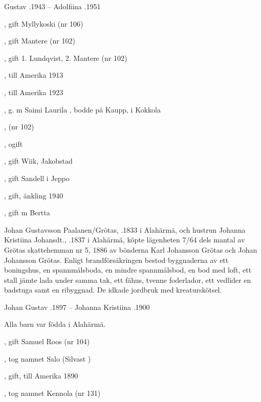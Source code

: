 Gustav .1943  --  Adolfiina .1951
\begin{jhchildren}
  \item {}, gift Myllykoski (nr 106)
  \item {}, gift Mantere (nr 102)
  \item {}, gift 1. Lundqvist, 2. Mantere (nr 102)
  \item {}, till Amerika 1913
  \item {}, till Amerika 1923
  \item {}, g. m Saimi Laurila , bodde på Kaupp,  i Kokkola
  \item {}
  \item {}, (nr 102)
  \item {}, ogift
  \item {}, gift Wiik, Jakobstad
  \item {}
  \item {}, gift Sandell i Jeppo
  \item {}, gift, änkling 1940
  \item {}, gift m Bertta
\end{jhchildren}


Johan Gustavsson Paalanen/Grötas, .1833 i Alahärmä, och hustrun Johanna Kristiina Johansdt., .1837 i Alahärmä, köpte lägenheten 7/64 dels mantal av Grötas skattehemman  nr 5, 1886 av bönderna Karl Johansson Grötas och Johan Johansson Grötas. Enligt brandförsäkringen bestod byggnaderna av ett boningshus, en spannmålsboda, en mindre spannmålsbod, en bod med loft, ett stall jämte lada under samma tak, ett fähus, tvenne foderlador, ett vedlider en badstuga samt en ribyggnad. De idkade jordbruk med kreaturskötsel.

Johan Gustav .1897  --  Johanna Kristiina .1900

Alla barn var födda i Alahärmä.
\begin{jhchildren}
  \item {}
  \item {}, gift Samuel Roos (nr 104)
  \item {}, tog namnet Salo (Silvast       )
  \item {}, gift, till Amerika 1890
  \item {}
  \item {}, tog namnet Kennola (nr 131)
\end{jhchildren}



